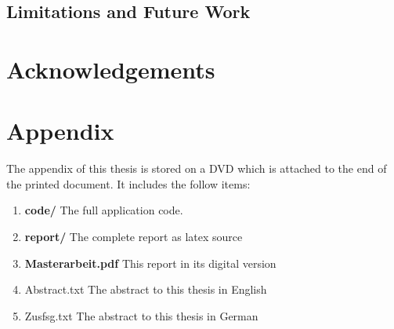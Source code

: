\documentclass[11pt, a4paper,oneside,chapterprefix=false]{scrbook}
\begin{document}
\section{Limitations and Future Work}

\chapter*{Acknowledgements}





\listoffigures
\listoftables
\appendix
\chapter{Appendix}
The appendix of this thesis is stored on a DVD which is attached to the end of the printed document. It includes the follow items: 
\begin{enumerate}
    \item \textbf{code/} The full application code. 
    \item \textbf{report/} The complete report as latex source
    \item \textbf{Masterarbeit.pdf} This report in its digital version
    \item{Abstract.txt} The abstract to this thesis in English
    \item {Zusfsg.txt} The abstract to this thesis in German
\end{enumerate}

\end{document}
